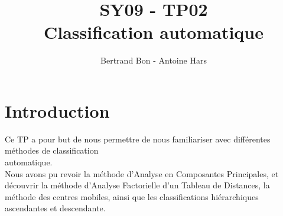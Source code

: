 \documentclass[a4paper, 10pt]{article}
\title{SY09 - TP02\\Classification automatique}
\author{Bertrand Bon - Antoine Hars}
\begin{document}
\maketitle

\section*{Introduction}
Ce TP a pour but de nous permettre de nous familiariser avec diff\'erentes m\'ethodes de classification\\automatique.\\
Nous avons pu revoir la m\'ethode d'Analyse en Composantes Principales,
et d\'ecouvrir la m\'ethode d'Analyse Factorielle d'un Tableau de Distances, la m\'ethode des centres mobiles,
ainsi que les classifications hi\'erarchiques ascendantes et descendante.\\ \\
\end{document}
